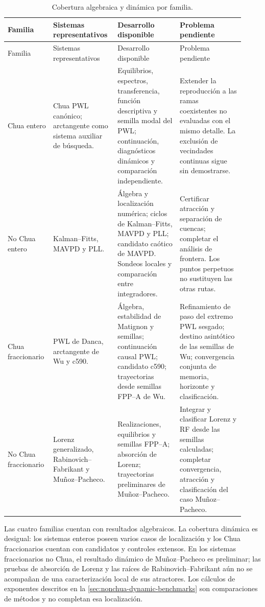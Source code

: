 \begin{longtable}{@{}L{0.16\linewidth}L{0.25\linewidth}L{0.25\linewidth}L{0.26\linewidth}@{}}
\caption{Cobertura algebraica y dinámica por familia.}
\label{tab:cobertura-cuatro-familias}\\
\toprule
Familia & Sistemas representativos & Desarrollo disponible & Problema pendiente\\
\midrule
\endfirsthead
\toprule
Familia & Sistemas representativos & Desarrollo disponible & Problema pendiente\\
\midrule
\endhead
Chua entero
& Chua PWL canónico; arctangente como sistema auxiliar de búsqueda.
& Equilibrios, espectros, transferencia, función descriptiva y semilla modal
del PWL; continuación, diagnósticos dinámicos y comparación independiente.
& Extender la reproducción a las ramas coexistentes no evaluadas con el
mismo detalle. La exclusión de vecindades continuas sigue sin demostrarse.\\
No Chua entero
& Kalman--Fitts, MAVPD y PLL.
& Álgebra y localización numérica; ciclos de Kalman--Fitts, MAVPD y PLL;
candidato caótico de MAVPD. Sondeos locales y comparación entre integradores.
& Certificar atracción y separación de cuencas; completar el análisis de
frontera. Los puntos perpetuos no sustituyen las otras rutas.\\
Chua fraccionario
& PWL de Danca, arctangente de Wu y c590.
& Álgebra, estabilidad de Matignon y semillas; continuación causal PWL;
candidato c590; trayectorias desde semillas FPP--A de Wu.
& Refinamiento de paso del extremo PWL sesgado; destino asintótico de las
semillas de Wu; convergencia conjunta de memoria, horizonte y clasificación.\\
No Chua fraccionario
& Lorenz generalizado, Rabinovich--Fabrikant y Muñoz--Pacheco.
& Realizaciones, equilibrios y semillas FPP--A; absorción de Lorenz;
trayectorias preliminares de Muñoz--Pacheco.
& Integrar y clasificar Lorenz y RF desde las semillas calculadas; completar
convergencia, atracción y clasificación del caso Muñoz--Pacheco.\\
\bottomrule
\end{longtable}

Las cuatro familias cuentan con resultados algebraicos. La cobertura dinámica
es desigual: los sistemas enteros poseen varios casos de localización y los
Chua fraccionarios cuentan con candidatos y controles extensos. En los
sistemas fraccionarios no Chua, el resultado dinámico de Muñoz--Pacheco es
preliminar; las pruebas de absorción de Lorenz y las raíces de
Rabinovich--Fabrikant aún no se acompañan de una caracterización local de sus
atractores. Los cálculos de exponentes descritos en la
\cref{sec:nonchua-dynamic-benchmarks} son comparaciones de métodos y no
completan esa localización.


